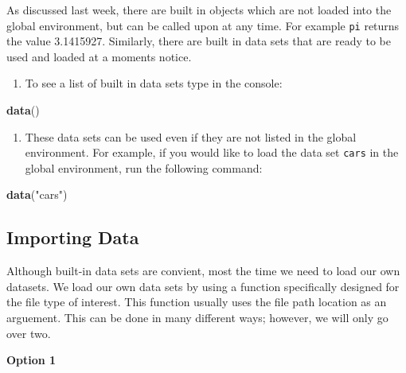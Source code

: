 \documentclass[
]{book}
\newenvironment{Shaded}{\begin{snugshade}}{\end{snugshade}}
\newcommand{\KeywordTok}[1]{\textcolor[rgb]{0.13,0.29,0.53}{\textbf{#1}}}
\newcommand{\NormalTok}[1]{#1}
\newcommand{\StringTok}[1]{\textcolor[rgb]{0.31,0.60,0.02}{#1}}
\providecommand{\tightlist}{%
  \setlength{\itemsep}{0pt}\setlength{\parskip}{0pt}}
\begin{document}
As discussed last week, there are built in objects which are not loaded into the global environment, but can be called upon at any time. For example \texttt{pi} returns the value 3.1415927. Similarly, there are built in data sets that are ready to be used and loaded at a moments notice.

\begin{enumerate}
\def\labelenumi{\arabic{enumi})}
\tightlist
\item
  To see a list of built in data sets type in the console:
\end{enumerate}

\begin{Shaded}
\begin{Highlighting}[]
\KeywordTok{data}\NormalTok{()}
\end{Highlighting}
\end{Shaded}

\begin{enumerate}
\def\labelenumi{\arabic{enumi})}
\setcounter{enumi}{1}
\tightlist
\item
  These data sets can be used even if they are not listed in the global environment. For example, if you would like to load the data set \texttt{cars} in the global environment, run the following command:
\end{enumerate}

\begin{Shaded}
\begin{Highlighting}[]
\KeywordTok{data}\NormalTok{(}\StringTok{"cars"}\NormalTok{)}
\end{Highlighting}
\end{Shaded}

\hypertarget{importing-data}{%
\subsection*{Importing Data}\label{importing-data}}

Although built-in data sets are convient, most the time we need to load our own datasets. We load our own data sets by using a function specifically designed for the file type of interest. This function usually uses the file path location as an arguement. This can be done in many different ways; however, we will only go over two.

\textbf{Option 1}
\end{document}
